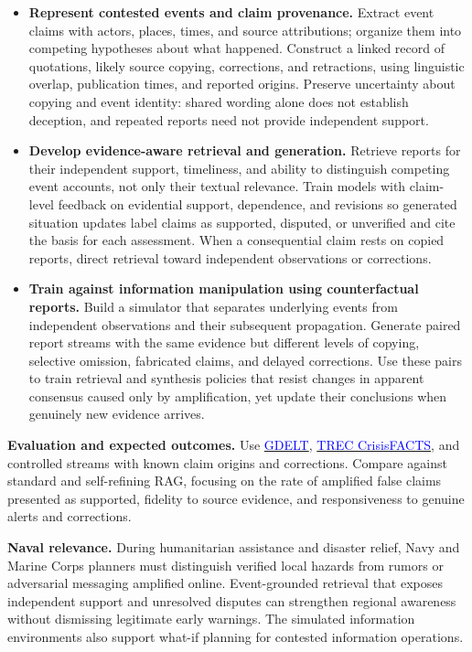 \documentclass[11pt,letterpaper]{article}
\newcommand{\head}[1]{\textbf{#1}\enspace}
\begin{document}
\begin{itemize}
\item \textbf{Represent contested events and claim provenance.} Extract event claims with actors, places, times, and source attributions; organize them into competing hypotheses about what happened. Construct a linked record of quotations, likely source copying, corrections, and retractions, using linguistic overlap, publication times, and reported origins. Preserve uncertainty about copying and event identity: shared wording alone does not establish deception, and repeated reports need not provide independent support.
\item \textbf{Develop evidence-aware retrieval and generation.} Retrieve reports for their independent support, timeliness, and ability to distinguish competing event accounts, not only their textual relevance. Train models with claim-level feedback on evidential support, dependence, and revisions so generated situation updates label claims as supported, disputed, or unverified and cite the basis for each assessment. When a consequential claim rests on copied reports, direct retrieval toward independent observations or corrections.
\item \textbf{Train against information manipulation using counterfactual reports.} Build a simulator that separates underlying events from independent observations and their subsequent propagation. Generate paired report streams with the same evidence but different levels of copying, selective omission, fabricated claims, and delayed corrections. Use these pairs to train retrieval and synthesis policies that resist changes in apparent consensus caused only by amplification, yet update their conclusions when genuinely new evidence arrives.
\end{itemize}
\head{Evaluation and expected outcomes.} Use \href{https://www.gdeltproject.org/}{\textcolor{blue}{GDELT}}, \href{https://trec.nist.gov/data/crisis.html}{\textcolor{blue}{TREC CrisisFACTS}}, and controlled streams with known claim origins and corrections. Compare against standard and self-refining RAG, focusing on the rate of amplified false claims presented as supported, fidelity to source evidence, and responsiveness to genuine alerts and corrections.
\par\head{Naval relevance.} During humanitarian assistance and disaster relief, Navy and Marine Corps planners must distinguish verified local hazards from rumors or adversarial messaging amplified online. Event-grounded retrieval that exposes independent support and unresolved disputes can strengthen regional awareness without dismissing legitimate early warnings. The simulated information environments also support what-if planning for contested information operations.
\end{document}
